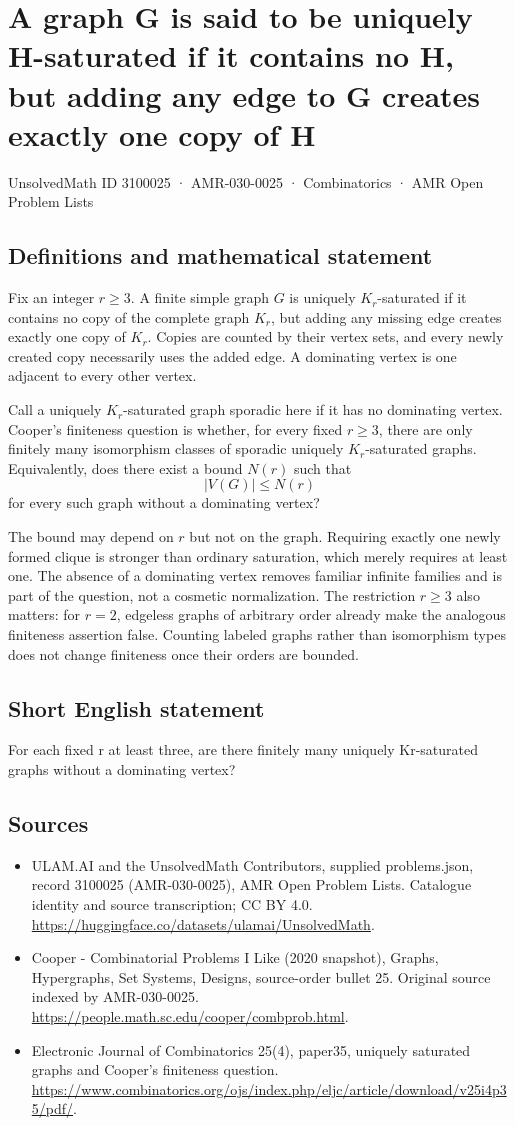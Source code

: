 \documentclass[11pt,a4paper]{article}
\begin{document}
\section*{A graph G is said to be uniquely H-saturated if it contains no H, but adding any edge to G creates exactly one copy of H}\label{3100025}
{\small UnsolvedMath ID 3100025 · AMR-030-0025 · Combinatorics · AMR Open Problem Lists}
\subsection{Definitions and mathematical statement}
Fix an integer $r\ge3$. A finite simple graph $G$ is uniquely
$K_r$-saturated if it contains no copy of the complete graph $K_r$,
but adding any missing edge creates exactly one copy of $K_r$.
Copies are counted by their vertex sets, and every newly created
copy necessarily uses the added edge. A dominating vertex is one
adjacent to every other vertex.

Call a uniquely $K_r$-saturated graph sporadic here if it has no
dominating vertex. Cooper's finiteness question is whether, for
every fixed $r\ge3$, there are only finitely many isomorphism
classes of sporadic uniquely $K_r$-saturated graphs. Equivalently,
does there exist a bound $N(r)$ such that
\[
          |V(G)|\le N(r)
\]
for every such graph without a dominating vertex?

The bound may depend on $r$ but not on the graph. Requiring exactly
one newly formed clique is stronger than ordinary saturation,
which merely requires at least one. The absence of a dominating
vertex removes familiar infinite families and is part of the
question, not a cosmetic normalization. The restriction $r\ge3$
also matters: for $r=2$, edgeless graphs of arbitrary order already
make the analogous finiteness assertion false. Counting labeled
graphs rather than isomorphism types does not change finiteness
once their orders are bounded.
\subsection{Short English statement}
For each fixed r at least three, are there finitely many uniquely Kr-saturated graphs without a dominating vertex?
\subsection{Sources}
\begin{itemize}
\item[S1] ULAM.AI and the UnsolvedMath Contributors, supplied problems.json, record 3100025 (AMR-030-0025), AMR Open Problem Lists. Catalogue identity and source transcription; CC BY 4.0.
\url{https://huggingface.co/datasets/ulamai/UnsolvedMath}.
\item[S2] Cooper - Combinatorial Problems I Like (2020 snapshot), Graphs, Hypergraphs, Set Systems, Designs, source-order bullet 25. Original source indexed by AMR-030-0025.
\url{https://people.math.sc.edu/cooper/combprob.html}.
\item[S3] Electronic Journal of Combinatorics 25(4), paper35, uniquely saturated graphs and Cooper’s finiteness question.
\url{https://www.combinatorics.org/ojs/index.php/eljc/article/download/v25i4p35/pdf/}.
\end{itemize}
\end{document}
